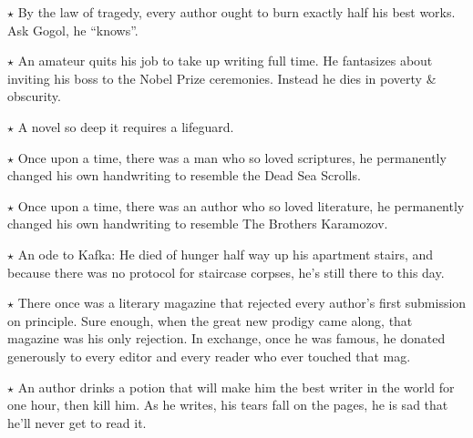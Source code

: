 \documentclass[oneside]{book}
\begin{document}

$\star$ By the law of tragedy, every author ought to burn exactly half
his best works.  Ask Gogol, he ``knows''.


$\star$ An amateur quits his job to take up writing full time.
He fantasizes about inviting his boss to the Nobel Prize ceremonies.
Instead he dies in poverty \& obscurity.

$\star$ A novel so deep it requires a lifeguard.

$\star$ Once upon a time, there was a man who so loved scriptures,
he permanently changed his own handwriting to resemble the Dead Sea Scrolls.

$\star$ Once upon a time, there was an author who so loved literature,
he permanently changed his own handwriting to resemble The Brothers Karamozov.


$\star$ An ode to Kafka: He died of hunger half way up his apartment stairs,
and because there was no protocol for staircase corpses, he's still there
to this day.

$\star$ There once was a literary magazine that rejected every author's first
submission on principle.  Sure enough, when the great new prodigy came along,
that magazine was his only rejection.  In exchange, once he was famous, he
donated generously to every editor and every reader who ever touched that mag.


$\star$ An author drinks a potion that will make him the best writer in the world
for one hour, then kill him.  As he writes, his tears fall on the pages, he is sad
that he'll never get to read it.

\end{document}

